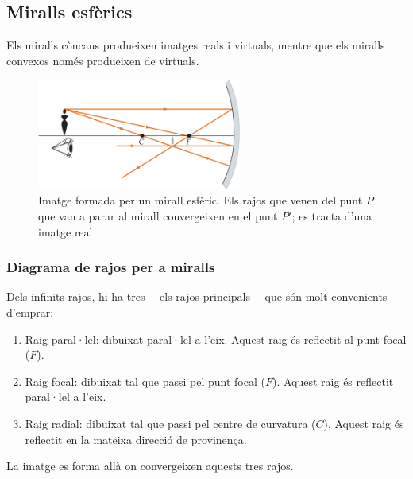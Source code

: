 \subsection{Miralls esfèrics}
Els miralls còncaus produeixen imatges reals i virtuals, mentre que els miralls convexos només produeixen de virtuals.
\begin{figure}[H]
\centering
    \includegraphics[width=0.6\textwidth]{images/4/42-mirall-esferic.png}
\caption{Imatge formada per un mirall esfèric. Els rajos que venen del punt $P$ que van a parar al mirall convergeixen en el punt $P'$; es tracta d'una imatge real}
\end{figure}

\subsubsection*{Diagrama de rajos per a miralls}
Dels infinits rajos, hi ha tres ---els rajos principals--- que són molt convenients d'emprar:
\begin{enumerate}
    \item Raig paral·lel: dibuixat paral·lel a l'eix. Aquest raig és reflectit al punt focal ($F$).
    \item Raig focal: dibuixat tal que passi pel punt focal ($F$). Aquest raig és reflectit paral·lel a l'eix.
    \item Raig radial: dibuixat tal que passi pel centre de curvatura ($C$). Aquest raig és reflectit en la mateixa direcció de provinença.
\end{enumerate}

La imatge es forma allà on convergeixen aquests tres rajos.

